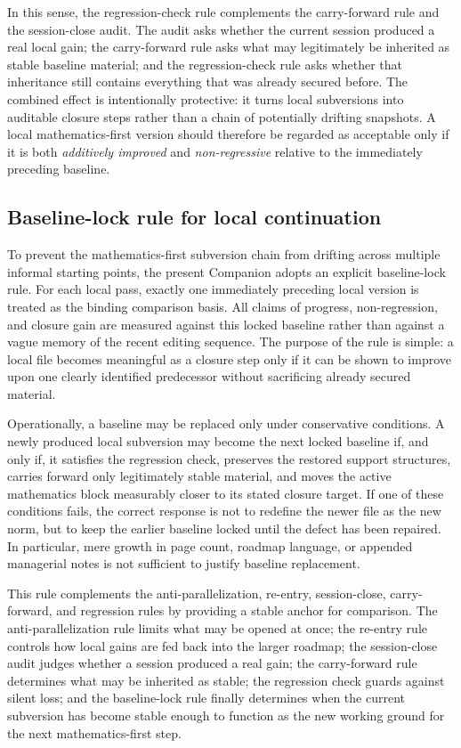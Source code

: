\documentclass[12pt,a4paper]{article}
\begin{document}
In this sense, the regression-check rule complements the carry-forward rule and the session-close audit. The audit asks whether the current session produced a real local gain; the carry-forward rule asks what may legitimately be inherited as stable baseline material; and the regression-check rule asks whether that inheritance still contains everything that was already secured before. The combined effect is intentionally protective: it turns local subversions into auditable closure steps rather than a chain of potentially drifting snapshots. A local mathematics-first version should therefore be regarded as acceptable only if it is both \emph{additively improved} and \emph{non-regressive} relative to the immediately preceding baseline.

\subsection*{Baseline-lock rule for local continuation}
To prevent the mathematics-first subversion chain from drifting across multiple informal starting points, the present Companion adopts an explicit baseline-lock rule. For each local pass, exactly one immediately preceding local version is treated as the binding comparison basis. All claims of progress, non-regression, and closure gain are measured against this locked baseline rather than against a vague memory of the recent editing sequence. The purpose of the rule is simple: a local file becomes meaningful as a closure step only if it can be shown to improve upon one clearly identified predecessor without sacrificing already secured material.

Operationally, a baseline may be replaced only under conservative conditions. A newly produced local subversion may become the next locked baseline if, and only if, it satisfies the regression check, preserves the restored support structures, carries forward only legitimately stable material, and moves the active mathematics block measurably closer to its stated closure target. If one of these conditions fails, the correct response is not to redefine the newer file as the new norm, but to keep the earlier baseline locked until the defect has been repaired. In particular, mere growth in page count, roadmap language, or appended managerial notes is not sufficient to justify baseline replacement.

This rule complements the anti-parallelization, re-entry, session-close, carry-forward, and regression rules by providing a stable anchor for comparison. The anti-parallelization rule limits what may be opened at once; the re-entry rule controls how local gains are fed back into the larger roadmap; the session-close audit judges whether a session produced a real gain; the carry-forward rule determines what may be inherited as stable; the regression check guards against silent loss; and the baseline-lock rule finally determines when the current subversion has become stable enough to function as the new working ground for the next mathematics-first step.
\end{document}
